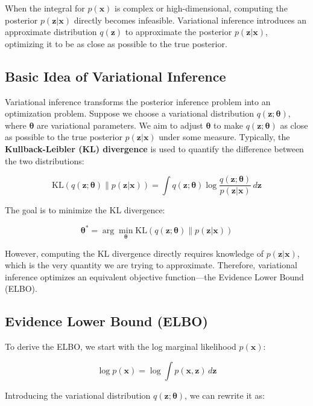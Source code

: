 \documentclass[10pt]{elegantbook}
\begin{document}
When the integral for \( p(\mathbf{x}) \) is complex or high-dimensional, computing the posterior \( p(\mathbf{z} | \mathbf{x}) \) directly becomes infeasible. Variational inference introduces an approximate distribution \( q(\mathbf{z}) \) to approximate the posterior \( p(\mathbf{z} | \mathbf{x}) \), optimizing it to be as close as possible to the true posterior.

\subsection{Basic Idea of Variational Inference}

Variational inference transforms the posterior inference problem into an optimization problem. Suppose we choose a variational distribution \( q(\mathbf{z}; \boldsymbol{\theta}) \), where \( \boldsymbol{\theta} \) are variational parameters. We aim to adjust \( \boldsymbol{\theta} \) to make \( q(\mathbf{z}; \boldsymbol{\theta}) \) as close as possible to the true posterior \( p(\mathbf{z} | \mathbf{x}) \) under some measure. Typically, the \textbf{Kullback-Leibler (KL) divergence} is used to quantify the difference between the two distributions:

\[
\text{KL}(q(\mathbf{z}; \boldsymbol{\theta}) \| p(\mathbf{z} | \mathbf{x})) = \int q(\mathbf{z}; \boldsymbol{\theta}) \log \frac{q(\mathbf{z}; \boldsymbol{\theta})}{p(\mathbf{z} | \mathbf{x})} \, d\mathbf{z}
\]

The goal is to minimize the KL divergence:

\[
\boldsymbol{\theta}^* = \arg\min_{\boldsymbol{\theta}} \text{KL}(q(\mathbf{z}; \boldsymbol{\theta}) \| p(\mathbf{z} | \mathbf{x}))
\]

However, computing the KL divergence directly requires knowledge of \( p(\mathbf{z} | \mathbf{x}) \), which is the very quantity we are trying to approximate. Therefore, variational inference optimizes an equivalent objective function—the Evidence Lower Bound (ELBO).

\subsection{Evidence Lower Bound (ELBO)}

To derive the ELBO, we start with the log marginal likelihood \( p(\mathbf{x}) \):

\[
\log p(\mathbf{x}) = \log \int p(\mathbf{x}, \mathbf{z}) \, d\mathbf{z}
\]

Introducing the variational distribution \( q(\mathbf{z}; \boldsymbol{\theta}) \), we can rewrite it as:
\end{document}

